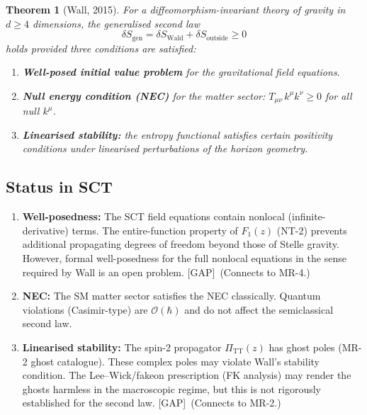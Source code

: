 \documentclass[12pt,a4paper]{article}
\newtheorem{theorem}[proposition]{Theorem}
\theoremstyle{definition}
\theoremstyle{remark}
\newcommand{\gap}{\textcolor{red!80!black}{\textsf{[GAP]}}}
\begin{document}
\begin{theorem}[Wall, 2015]\label{thm:wall}
For a diffeomorphism-invariant theory of gravity in $d \geq 4$
dimensions, the generalised second law
\begin{equation}
  \delta S_{\mathrm{gen}} = \delta S_{\mathrm{Wald}}
  + \delta S_{\mathrm{outside}} \geq 0
\end{equation}
holds provided three conditions are satisfied:
\begin{enumerate}[nosep]
\item \textbf{Well-posed initial value problem} for the
  gravitational field equations.
\item \textbf{Null energy condition (NEC)} for the matter sector:
  $T_{\mu\nu}\,k^\mu k^\nu \geq 0$ for all null $k^\mu$.
\item \textbf{Linearised stability:} the entropy functional
  satisfies certain positivity conditions under linearised
  perturbations of the horizon geometry.
\end{enumerate}
\end{theorem}

\subsection{Status in SCT}

\begin{enumerate}[nosep]
\item \textbf{Well-posedness:} The SCT field equations contain
  nonlocal (infinite-derivative) terms.  The entire-function
  property of $F_1(z)$ (NT-2) prevents additional propagating
  degrees of freedom beyond those of Stelle gravity.  However,
  formal well-posedness for the full nonlocal equations in the
  sense required by Wall is an open problem.
  \gap\ (Connects to MR-4.)

\item \textbf{NEC:} The SM matter sector satisfies the NEC
  classically.  Quantum violations (Casimir-type) are
  $\mathcal{O}(\hbar)$ and do not affect the semiclassical
  second law.

\item \textbf{Linearised stability:} The spin-2 propagator
  $\Pi_{\mathrm{TT}}(z)$ has ghost poles (MR-2 ghost catalogue).
  These complex poles may violate Wall's stability condition.
  The Lee--Wick/fakeon prescription (FK analysis) may render
  the ghosts harmless in the macroscopic regime, but this is
  not rigorously established for the second law.
  \gap\ (Connects to MR-2.)
\end{enumerate}
\end{document}
